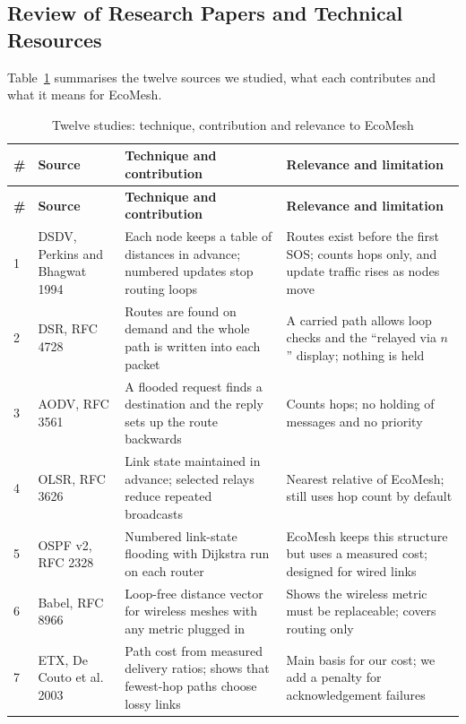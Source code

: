 \subsection{Review of Research Papers and Technical Resources}
\label{sec:papers}
Table~\ref{tab:studies} summarises the twelve sources we studied, what each contributes and what it means for EcoMesh.
\begingroup\footnotesize
\setlength{\tabcolsep}{3pt}
\begin{longtable}{@{}p{0.5cm}>{\raggedright\arraybackslash}p{3.5cm}p{6.3cm}p{6.0cm}@{}}
\caption{Twelve studies: technique, contribution and relevance to EcoMesh}\label{tab:studies}\\
\toprule \textbf{\#} & \textbf{Source} & \textbf{Technique and contribution} & \textbf{Relevance and limitation}\\ \midrule \endfirsthead
\toprule \textbf{\#} & \textbf{Source} & \textbf{Technique and contribution} & \textbf{Relevance and limitation}\\ \midrule \endhead
1 & DSDV, Perkins and Bhagwat 1994~\cite{perkins1994dsdv} & Each node keeps a table of distances in advance; numbered updates stop routing loops & Routes exist before the first SOS; counts hops only, and update traffic rises as nodes move\\
2 & DSR, RFC 4728~\cite{rfc4728dsr} & Routes are found on demand and the whole path is written into each packet & A carried path allows loop checks and the ``relayed via $n$'' display; nothing is held\\
3 & AODV, RFC 3561~\cite{rfc3561aodv} & A flooded request finds a destination and the reply sets up the route backwards & Counts hops; no holding of messages and no priority\\
4 & OLSR, RFC 3626~\cite{rfc3626olsr} & Link state maintained in advance; selected relays reduce repeated broadcasts & Nearest relative of EcoMesh; still uses hop count by default\\
5 & OSPF v2, RFC 2328~\cite{rfc2328ospf} & Numbered link-state flooding with Dijkstra run on each router & EcoMesh keeps this structure but uses a measured cost; designed for wired links\\
6 & Babel, RFC 8966~\cite{rfc8966babel} & Loop-free distance vector for wireless meshes with any metric plugged in & Shows the wireless metric must be replaceable; covers routing only\\
7 & ETX, De Couto et al. 2003~\cite{decouto2003etx} & Path cost from measured delivery ratios; shows that fewest-hop paths choose lossy links & Main basis for our cost; we add a penalty for acknowledgement failures\\

\end{longtable}
